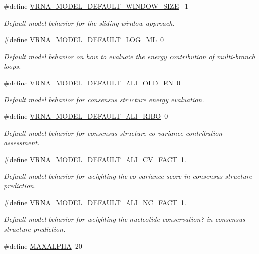 \begin{DoxyCompactItemize}
\#define \hyperlink{group__model__details_ga8de04a9cb57e811e313b0f9f207f6bdb}{V\+R\+N\+A\+\_\+\+M\+O\+D\+E\+L\+\_\+\+D\+E\+F\+A\+U\+L\+T\+\_\+\+W\+I\+N\+D\+O\+W\+\_\+\+S\+I\+ZE}~-\/1
\begin{DoxyCompactList}\small\item\em Default model behavior for the sliding window approach. \end{DoxyCompactList}\item 
\#define \hyperlink{group__model__details_ga938f68463e84fe060aa6502f428a517d}{V\+R\+N\+A\+\_\+\+M\+O\+D\+E\+L\+\_\+\+D\+E\+F\+A\+U\+L\+T\+\_\+\+L\+O\+G\+\_\+\+ML}~0
\begin{DoxyCompactList}\small\item\em Default model behavior on how to evaluate the energy contribution of multi-\/branch loops. \end{DoxyCompactList}\item 
\#define \hyperlink{group__model__details_ga2a5bbfc1edf33077e39466d2d9807115}{V\+R\+N\+A\+\_\+\+M\+O\+D\+E\+L\+\_\+\+D\+E\+F\+A\+U\+L\+T\+\_\+\+A\+L\+I\+\_\+\+O\+L\+D\+\_\+\+EN}~0
\begin{DoxyCompactList}\small\item\em Default model behavior for consensus structure energy evaluation. \end{DoxyCompactList}\item 
\#define \hyperlink{group__model__details_ga64b3ab65a9ca42d4ad1d05e193083147}{V\+R\+N\+A\+\_\+\+M\+O\+D\+E\+L\+\_\+\+D\+E\+F\+A\+U\+L\+T\+\_\+\+A\+L\+I\+\_\+\+R\+I\+BO}~0
\begin{DoxyCompactList}\small\item\em Default model behavior for consensus structure co-\/variance contribution assessment. \end{DoxyCompactList}\item 
\#define \hyperlink{group__model__details_gaaaf3d73d6abc18d3889676952bfedb96}{V\+R\+N\+A\+\_\+\+M\+O\+D\+E\+L\+\_\+\+D\+E\+F\+A\+U\+L\+T\+\_\+\+A\+L\+I\+\_\+\+C\+V\+\_\+\+F\+A\+CT}~1.
\begin{DoxyCompactList}\small\item\em Default model behavior for weighting the co-\/variance score in consensus structure prediction. \end{DoxyCompactList}\item 
\#define \hyperlink{group__model__details_ga8f774daaafec28160c1ca5d09f2cbdba}{V\+R\+N\+A\+\_\+\+M\+O\+D\+E\+L\+\_\+\+D\+E\+F\+A\+U\+L\+T\+\_\+\+A\+L\+I\+\_\+\+N\+C\+\_\+\+F\+A\+CT}~1.
\begin{DoxyCompactList}\small\item\em Default model behavior for weighting the nucleotide conservation? in consensus structure prediction. \end{DoxyCompactList}\item 
\#define \hyperlink{group__model__details_ga05a5ffe718aa431d97419a12fb082379}{M\+A\+X\+A\+L\+P\+HA}~20\hypertarget{group__model__details_ga05a5ffe718aa431d97419a12fb082379}{}\label{group__model__details_ga05a5ffe718aa431d97419a12fb082379}


\end{DoxyCompactItemize}
